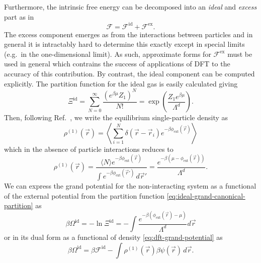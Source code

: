 Furthermore, the intrinsic free energy can be decomposed into an \emph{ideal} and \emph{excess} part as in
\begin{equation}\label{eq:F-decomposition}
  \mathcal{F}
  =
  \mathcal{F}^\mathrm{id} +
  \mathcal{F}^\mathrm{ex}.
\end{equation}
The excess component emerges as from the interactions between particles and in general it is intractably hard to determine this exactly except in special limits (e.g.\ in the one-dimensional limit).
As such, approximate forms for $\mathcal{F}^\mathrm{ex}$ must be used in general which contrains the success of applications of DFT to the accuracy of this contribution.
By contrast, the ideal component can be computed explicitly.
The partition function for the ideal gas is easily calculated giving
\begin{equation}\label{eq:ideal-grand-canonical-partition}
  \Xi^\mathrm{id}
  =
  \sum_{N=0}^\infty
  \frac{(e^{\beta\mu} Z_1)^N}{N!}
  =
  \exp{\left( \frac{Z_1 e^{\beta \mu}}{\Lambda^d} \right)}.
\end{equation}
Then, following Ref.\ \cite{Ashcroft1996}, we write the equilibrium single-particle density as
\begin{equation*}
  \rho^{(1)}(\vec{r})
  =
  \left\langle
  \sum_{i=1}^N \delta(\vec{r} - \vec{r}_i)
  e^{-\beta \phi_\mathrm{ext}(\vec{r})}
  \right\rangle
\end{equation*}
which in the absence of particle interactions reduces to
\begin{equation}\label{eq:ideal-density}
  \rho^{(1)}(\vec{r})
  =
  \frac{
    \langle N \rangle e^{-\beta \phi_\mathrm{ext}(\vec{r})}
  }{
    \int e^{-\beta \phi_\mathrm{ext}(\vec{r}')} \, d\vec{r}'
  }
  =
  \frac{e^{-\beta (\mu - \phi_\mathrm{ext}(\vec{r}))}}{\Lambda^d}.
\end{equation}
We can express the grand potential for the non-interacting system as a functional of the external potential from the partition function \eqref{eq:ideal-grand-canonical-partition} as
\begin{equation*}
  \beta\Omega^\mathrm{id}
  =
  - \ln{\Xi^\mathrm{id}}
  =
  - \int \frac{e^{-\beta (\phi_\mathrm{ext}(\vec{r}) - \mu)}}{\Lambda^d} d\vec{r}
\end{equation*}
or in its dual form as a functional of density \eqref{eq:dft-grand-potential} as
\begin{equation*}
  \beta\Omega^\mathrm{id}
  =
  \beta \mathcal{F}^\mathrm{id}
  - \int \rho^{(1)}(\vec{r}) \beta \psi(\vec{r}) \, d\vec{r}.
\end{equation*}
